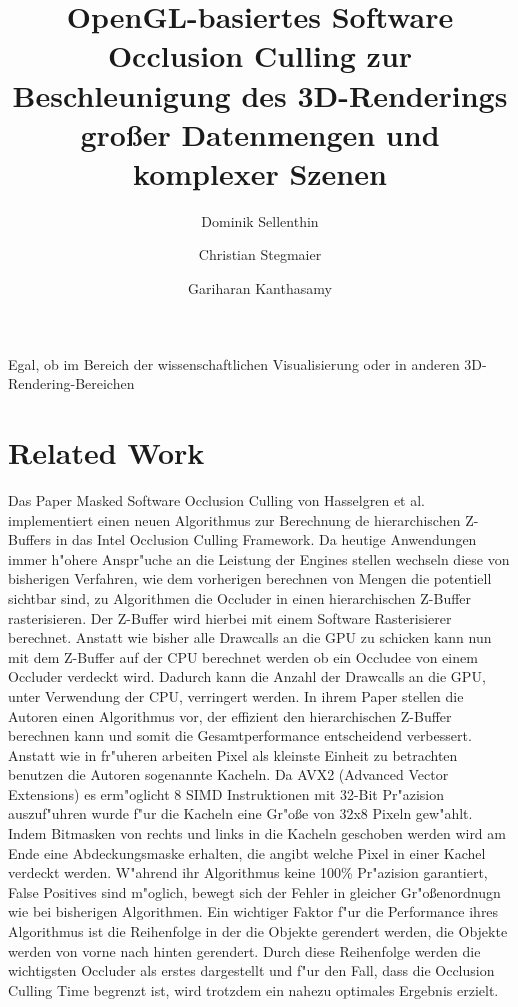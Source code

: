 \documentclass[journal]{vgtc}
\author{Dominik Sellenthin \and Christian Stegmaier \and Gariharan Kanthasamy}
\title{OpenGL-basiertes Software Occlusion Culling zur Beschleunigung des 3D-Renderings gro{\ss}er Datenmengen und komplexer Szenen}
\begin{document}


\maketitle

Egal, ob im Bereich der wissenschaftlichen Visualisierung oder in anderen 3D-Rendering-Bereichen

\section{Related Work}

Das Paper \glqq Masked Software Occlusion Culling \grqq{} von Hasselgren et al. implementiert einen neuen Algorithmus zur Berechnung de hierarchischen Z-Buffers in das Intel Occlusion Culling Framework.
Da heutige Anwendungen immer h"ohere Anspr"uche an die Leistung der Engines stellen wechseln diese von bisherigen Verfahren, wie dem vorherigen berechnen von Mengen die potentiell sichtbar sind, zu Algorithmen die Occluder in einen hierarchischen Z-Buffer rasterisieren.
Der Z-Buffer wird hierbei mit einem Software Rasterisierer berechnet.
Anstatt wie bisher alle Drawcalls an die GPU zu schicken kann nun mit dem Z-Buffer auf der CPU berechnet werden ob ein Occludee von einem Occluder verdeckt wird.
Dadurch kann die Anzahl der Drawcalls an die GPU, unter Verwendung der CPU, verringert werden. In ihrem Paper stellen die Autoren einen Algorithmus vor, der effizient den hierarchischen Z-Buffer berechnen kann und somit die Gesamtperformance entscheidend verbessert.
Anstatt wie in fr"uheren arbeiten Pixel als kleinste Einheit zu betrachten benutzen die Autoren sogenannte Kacheln. Da AVX2 (Advanced Vector Extensions) es erm"oglicht 8 SIMD Instruktionen mit 32-Bit Pr"azision auszuf"uhren wurde f"ur die Kacheln eine Gr"o\ss{}e von 32x8 Pixeln gew"ahlt.
Indem Bitmasken von rechts und links in die Kacheln geschoben werden wird am Ende eine Abdeckungsmaske erhalten, die angibt welche Pixel in einer Kachel verdeckt werden.
W"ahrend ihr Algorithmus keine 100\% Pr"azision garantiert, False Positives sind m"oglich, bewegt sich der Fehler in gleicher Gr"o\ss{}enordnugn wie bei bisherigen Algorithmen.
Ein wichtiger Faktor f"ur die Performance ihres Algorithmus ist die Reihenfolge in der die Objekte gerendert werden, die Objekte werden von vorne nach hinten gerendert.
Durch diese Reihenfolge werden die wichtigsten Occluder als erstes dargestellt und f"ur den Fall, dass die Occlusion Culling Time begrenzt ist, wird trotzdem ein nahezu optimales Ergebnis erzielt.
\end{document}
